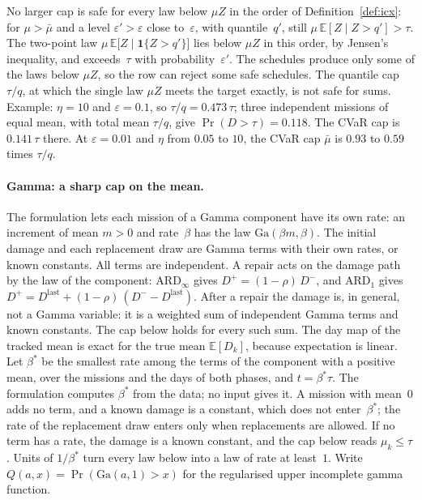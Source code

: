 \documentclass[11pt,a4paper]{article}
\theoremstyle{plain}
\theoremstyle{definition}
\theoremstyle{remark}
\begin{document}
No larger cap is safe for every law below $\mu Z$ in the order of Definition~\ref{def:icx}: for $\mu > \bar\mu$ and a level $\varepsilon' > \varepsilon$ close to~$\varepsilon$, with quantile~$q'$, still $\mu\,\mathbb{E}[Z \mid Z > q'] > \tau$.
The two-point law $\mu\,\mathbb{E}\bigl[Z \mid \mathbf{1}\{Z > q'\}\bigr]$ lies below $\mu Z$ in this order, by Jensen's inequality, and exceeds~$\tau$ with probability~$\varepsilon'$.
The schedules produce only some of the laws below $\mu Z$, so the row can reject some safe schedules.
The quantile cap $\tau/q$, at which the single law $\mu Z$ meets the target exactly, is not safe for sums.
Example: $\eta = 10$ and $\varepsilon = 0.1$, so $\tau/q = 0.473\,\tau$; three independent missions of equal mean, with total mean $\tau/q$, give $\Pr(D > \tau) = 0.118$.
The CVaR cap is $0.141\,\tau$ there.
At $\varepsilon = 0.01$ and $\eta$ from $0.05$ to $10$, the CVaR cap $\bar\mu$ is $0.93$ to $0.59$ times $\tau/q$.

\paragraph{Gamma: a sharp cap on the mean.}
The formulation lets each mission of a Gamma component have its own rate: an increment of mean $m > 0$ and rate~$\beta$ has the law $\mathrm{Ga}(\beta m, \beta)$.
The initial damage and each replacement draw are Gamma terms with their own rates, or known constants.
All terms are independent.
A repair acts on the damage path by the law of the component: $\text{ARD}_\infty$ gives $D^+ = (1-\rho)\,D^-$, and $\text{ARD}_1$ gives $D^+ = D^{\mathrm{last}} + (1-\rho)\,(D^- - D^{\mathrm{last}})$.
After a repair the damage is, in general, not a Gamma variable: it is a weighted sum of independent Gamma terms and known constants.
The cap below holds for every such sum.
The day map of the tracked mean is exact for the true mean $\mathbb{E}[D_k]$, because expectation is linear.
Let $\beta^*$ be the smallest rate among the terms of the component with a positive mean, over the missions and the days of both phases, and $t = \beta^*\tau$.
The formulation computes $\beta^*$ from the data; no input gives it.
A mission with mean~$0$ adds no term, and a known damage is a constant, which does not enter~$\beta^*$; the rate of the replacement draw enters only when replacements are allowed.
If no term has a rate, the damage is a known constant, and the cap below reads $\mu_k \le \tau$.
Units of $1/\beta^*$ turn every law below into a law of rate at least~$1$.
Write $Q(a, x) = \Pr(\mathrm{Ga}(a,1) > x)$ for the regularised upper incomplete gamma function.
\end{document}
